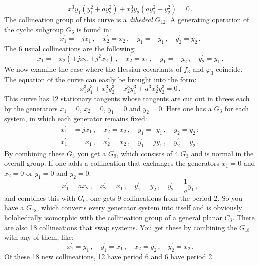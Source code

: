 \documentclass[leqno]{article}
\begin{document}
\begin{equation}\label{eq: 5.11}
x_1^3 y_1 (y_1^2 + a y_2^2) + x_2^3 y_2 (a y_1^2 + y_2^2) = 0 \, . \tag{11}
\end{equation}
The collineation group of this curve is a \textit{dihedral} $G_{12}$. A generating operation of the cyclic subgroup $G_6$ is found in:
\[
x_1^\prime = -j x_1 \, , \quad x_2^\prime = x_2 \, , \quad y_1^\prime =-y_1 \, , \quad y_2^\prime = y_2 \, .
\]
The 6 usual collineations are the following:
\[
x_1^\prime = \pm x_2(\pm j x_2 , \pm j^2 x_2) \, , \quad x_2^\prime = x_1 \, , \quad y_1^\prime = \pm y_2 \, , \quad y_2^\prime = y_1 \, . 
\]
We now examine the case where the Hessian covariants of $f_3$ and $\varphi_3$ coincide. The equation of the curve can easily be brought into the form:
\begin{equation}\label{eq: 5.12}
x_1^3 y_1^3 + x_1^3 y_2^3 + x_2^3 y_1^3 + a^3 x_2^3 y_2^3 = 0 \, . \tag{12}
\end{equation}
This curve has 12 stationary tangents whose tangents are cut out in threes each by the generators $x_1=0$, $x_2=0$, $y_1=0$ and $y_2=0$. Here one has a $G_3$ for each system, in which each generator remains fixed:
\begin{align*}
	x_1^\prime &= j x_1 \, , \quad  x_2^\prime = x_2 \, , \quad y_1^\prime = \phantom{j} y_1 \, , \quad y_2^\prime = y_2 \, ; \\
	x_1^\prime &= \phantom{j} x_1 \, , \quad x_2^\prime = x_2 \, , \quad y_1^\prime = j y_1 \, , \quad y_2^\prime = y_2 \, .
\end{align*}
By combining these $G_3$ you get a $G_9$, which consists of 4 $G_3$ and is normal in the overall group. If one adds a collineation that exchanges the generators $x_1 = 0$ and $x_2 = 0$ or $y_1 = 0$ and $y_2 = 0$: 
\[
x_1^\prime = a x_2 \, , \quad x_2^\prime = x_1 \, , \quad y_1^\prime = y_2 \, , \quad y_2^\prime = \frac{1}{a} y_1 \, , 
\]
and combines this with $G_6$, one gets 9 collineations from the period 2. So you have a $G_{18}$, which converts every generator system into itself and is obviously holohedrally isomorphic with the collineation group of a general planar $C_3$. There are also 18 collineations that swap systems. You get these by combining the $G_{18}$ with any of them, like:
\[
x_1^\prime = y_1 \, , \quad y_1^\prime = x_1 \, , \quad x_2^\prime = y_2 \, , \quad y_2^\prime = x_2 \, . 
\]
Of these 18 new collineations, 12 have period 6 and 6 have period 2. \\
\end{document}
